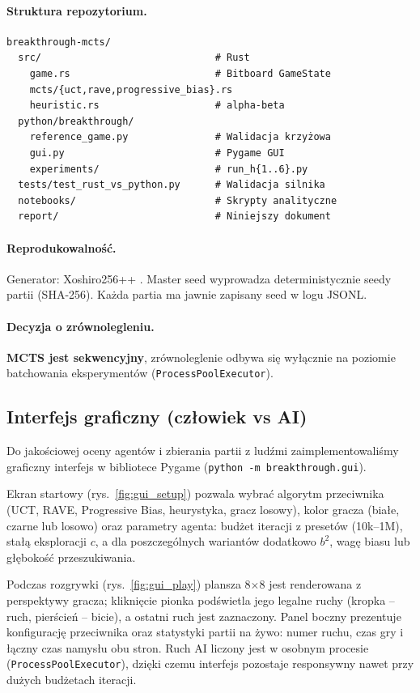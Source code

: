 \paragraph{Struktura repozytorium.}
\begin{verbatim}
breakthrough-mcts/
  src/                              # Rust
    game.rs                         # Bitboard GameState
    mcts/{uct,rave,progressive_bias}.rs
    heuristic.rs                    # alpha-beta
  python/breakthrough/
    reference_game.py               # Walidacja krzyżowa
    gui.py                          # Pygame GUI
    experiments/                    # run_h{1..6}.py
  tests/test_rust_vs_python.py      # Walidacja silnika
  notebooks/                        # Skrypty analityczne
  report/                           # Niniejszy dokument
\end{verbatim}

\paragraph{Reprodukowalność.}
Generator: Xoshiro256++ \cite{vigna2017}. Master seed wyprowadza
deterministycznie seedy partii (SHA-256). Każda partia ma jawnie zapisany seed
w logu JSONL.

\paragraph{Decyzja o zrównolegleniu.}
\textbf{MCTS jest sekwencyjny}, zrównoleglenie odbywa się wyłącznie na poziomie
batchowania eksperymentów (\texttt{ProcessPoolExecutor}).

\subsection{Interfejs graficzny (człowiek vs AI)}
\label{sec:gui}

Do jakościowej oceny agentów i zbierania partii z ludźmi zaimplementowaliśmy
graficzny interfejs w bibliotece Pygame (\texttt{python -m breakthrough.gui}).

Ekran startowy (rys.~\ref{fig:gui_setup}) pozwala wybrać algorytm przeciwnika
(UCT, RAVE, Progressive Bias, heurystyka, gracz losowy), kolor gracza (białe,
czarne lub losowo) oraz parametry agenta: budżet iteracji z presetów
(10k--1M), stałą eksploracji $c$, a dla poszczególnych wariantów dodatkowo
$b^2$, wagę biasu lub głębokość przeszukiwania.

Podczas rozgrywki (rys.~\ref{fig:gui_play}) plansza 8$\times$8 jest renderowana
z perspektywy gracza; kliknięcie pionka podświetla jego legalne ruchy (kropka --
ruch, pierścień -- bicie), a ostatni ruch jest zaznaczony. Panel boczny
prezentuje konfigurację przeciwnika oraz statystyki partii na żywo: numer ruchu,
czas gry i łączny czas namysłu obu stron. Ruch AI liczony jest w osobnym procesie
(\texttt{ProcessPoolExecutor}), dzięki czemu interfejs pozostaje responsywny
nawet przy dużych budżetach iteracji.

